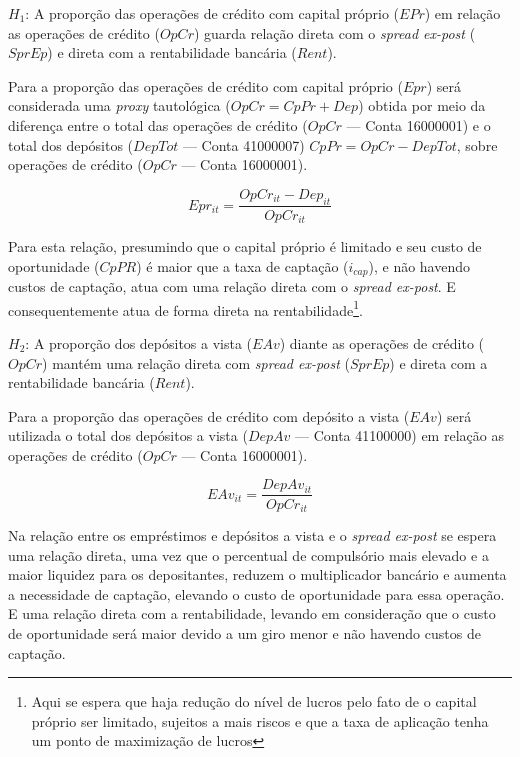 \documentclass[
  12pt,
  12pt,
  openright,
  oneside,
  a4paper,
  chapter=TITLE,
  section=TITLE,
  subsection=TITLE,
  subsubsection=TITLE,
  english,
  portugues,
  sumario=tradicional]{abntex2}
\begin{document}
\vspace{-7mm}

\label{qdr:hipoteses}
\vspace{20pt}

\parindent 1.50cm

\(H_{1}\): A proporção das operações de crédito com capital próprio (\(EPr\)) em relação as operações de crédito (\(OpCr\)) guarda relação direta com o \emph{spread ex-post} (\(SprEp\)) e direta com a rentabilidade bancária (\(Rent\)).

Para a proporção das operações de crédito com capital próprio (\(Epr\)) será considerada uma \emph{proxy} tautológica (\(OpCr = CpPr + Dep\)) obtida por meio da diferença entre o total das operações de crédito (\(OpCr\) --- Conta 16000001) e o total dos depósitos (\(DepTot\) --- Conta 41000007) \(CpPr = OpCr - DepTot\), sobre operações de crédito (\(OpCr\) --- Conta 16000001).

\begin{equation}
Epr_{it} = \frac{OpCr_{it} - Dep_{it}}{OpCr_{it}}
\end{equation}

Para esta relação, presumindo que o capital próprio é limitado e seu custo de oportunidade (\(CpPR\)) é maior que a taxa de captação (\(i_{cap}\)), e não havendo custos de captação, atua com uma relação direta com o \emph{spread ex-post}. E consequentemente atua de forma direta na rentabilidade\footnote{Aqui se espera que haja redução do nível de lucros pelo fato de o capital próprio ser limitado, sujeitos a mais riscos e que a taxa de aplicação tenha um ponto de maximização de lucros}.

\(H_{2}\): A proporção dos depósitos a vista (\(EAv\)) diante as operações de crédito (\(OpCr\)) mantém uma relação direta com \emph{spread ex-post} (\(SprEp\)) e direta com a rentabilidade bancária (\(Rent\)).

Para a proporção das operações de crédito com depósito a vista (\(EAv\)) será utilizada o total dos depósitos a vista (\(DepAv\) --- Conta 41100000) em relação as operações de crédito (\(OpCr\) --- Conta 16000001).

\begin{equation}
EAv_{it} = \frac{DepAv_{it}}{OpCr_{it}}
\end{equation}

Na relação entre os empréstimos e depósitos a vista e o \emph{spread ex-post} se espera uma relação direta, uma vez que o percentual de compulsório mais elevado e a maior liquidez para os depositantes, reduzem o multiplicador bancário e aumenta a necessidade de captação, elevando o custo de oportunidade para essa operação. E uma relação direta com a rentabilidade, levando em consideração que o custo de oportunidade será maior devido a um giro menor e não havendo custos de captação.
\end{document}
